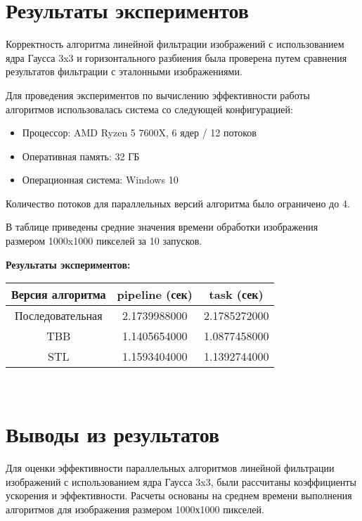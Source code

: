 \documentclass{report}
\begin{document}
\section*{Результаты экспериментов}
\par Корректность алгоритма линейной фильтрации изображений с использованием ядра Гаусса 3x3 и горизонтального разбиения была проверена путем сравнения результатов фильтрации с эталонными изображениями.
\par Для проведения экспериментов по вычислению эффективности работы алгоритмов использовалась система со следующей конфигурацией:
\begin{itemize}
\item Процессор: AMD Ryzen 5 7600X, 6 ядер / 12 потоков
\item Оперативная память: 32 ГБ
\item Операционная система: Windows 10
\end{itemize}
\par Количество потоков для параллельных версий алгоритма было ограничено до 4.
\par В таблице приведены средние значения времени обработки изображения размером 1000x1000 пикселей за 10 запусков.

\par \textbf{Результаты экспериментов:}
\begin{center}
\begin{tabular}{ ||c | c | c || }
\hline Версия алгоритма & pipeline (сек) & task (сек)\\
\hline Последовательная & 2.1739988000 & 2.1785272000 \\
\hline TBB & 1.1405654000 & 1.0877458000 \\
\hline STL & 1.1593404000 & 1.1392744000 \\
\hline
\end{tabular}\\[3mm]
\end{center}

\newpage

\section*{Выводы из результатов}
\par Для оценки эффективности параллельных алгоритмов линейной фильтрации изображений с использованием ядра Гаусса 3x3, были рассчитаны коэффициенты ускорения и эффективности. Расчеты основаны на среднем времени выполнения алгоритмов для изображения размером 1000х1000 пикселей.
\end{document}
